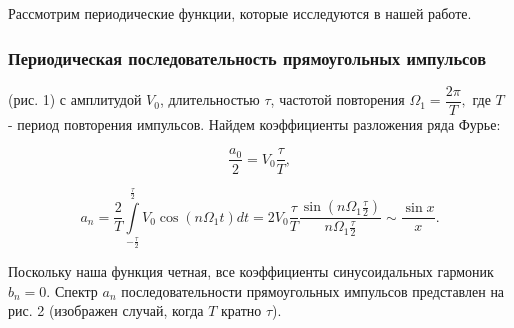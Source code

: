 \documentclass[a4paper, 12pt]{article}
\begin{document}
	        Рассмотрим периодические функции, которые исследуются в нашей работе.

            \subsubsection{Периодическая последовательность прямоугольных импульсов}

                (рис. 1) с амплитудой $V_{0}$, длительностью $\tau$, частотой повторения $\Omega_{1}=\dfrac{2\pi}{T},$ где $T$ - период повторения импульсов. Найдем коэффициенты разложения ряда Фурье:

                $$\dfrac{a_{0}}{2}=V_{0}\dfrac{\tau}{T},$$

                \begin{equation}
                    a_{n}=\dfrac{2}{T}\int\limits_{-\frac{\tau}{2}}^{\frac{\tau}{2}}V_{0}\cos(n \Omega_{1} t)dt=2V_{0}\dfrac{\tau}{T}\dfrac{\sin(n \Omega_{1} \frac{\tau}{2})}{n\Omega_{1}\frac{\tau}{2}} \sim \dfrac{\sin x}{x}.
                    \label{eq4}
                \end{equation}

                Поскольку наша функция четная, все коэффициенты синусоидальных гармоник $b_{n}=0$. Спектр $a_{n}$ последовательности прямоугольных импульсов представлен на рис. 2 (изображен случай, когда $T$ кратно $\tau$).
\end{document}
